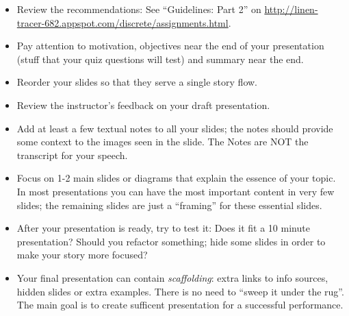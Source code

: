 \documentclass[jou]{apa6}
\begin{document}
\begin{itemize}
\item Review the recommendations: See ``Guidelines: Part 2'' on
\url{http://linen-tracer-682.appspot.com/discrete/assignments.html}. 
\item Pay attention to motivation, objectives near the end of your 
presentation (stuff that your quiz questions will test)
and summary near the end.
\item Reorder your slides so that they serve a single story flow. 
\item Review the instructor's feedback on your draft presentation. 
\item Add at least a few textual notes to all your slides; the notes
should provide some context to the images seen in the slide. 
The Notes are NOT the transcript for your speech.
\item Focus on 1-2 main slides or diagrams that explain the essence 
of your topic. In most presentations you can have the most important
content in very few slides; the remaining slides are just a ``framing'' 
for these essential slides.
\item After your presentation is ready, try to test it: Does it 
fit a 10 minute presentation? Should you refactor something; hide some
slides in order to make your story more focused?
\item Your final presentation can contain {\em scaffolding}: 
extra links to info sources, hidden slides or extra examples. 
There is no need to ``sweep it under the rug''. The main 
goal is to create sufficent presentation for a successful performance.
\end{itemize}
\end{document}
